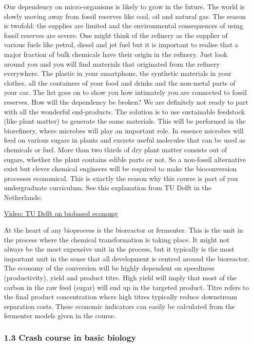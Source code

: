 \documentclass[11pt]{article}
\begin{document}
Our dependency on micro-organisms is likely to grow in the future. The
world is slowly moving away from fossil reserves like coal, oil and
natural gas. The reason is twofold: the supplies are limited and the
environmental consequences of using fossil reserves are severe. One
might think of the refinery as the supplier of various fuels like
petrol, diesel and jet fuel but it is important to realise that a major
fraction of bulk chemicals have their origin in the refinery. Just look
around you and you will find materials that originated from the refinery
everywhere. The plastic in your smartphone, the synthetic materials in
your clothes, all the containers of your food and drinks and the
non-metal parts of your car. The list goes on to show you how intimately
you are connected to fossil reserves. How will the dependency be broken?
We are definitely not ready to part with all the wonderful end-products.
The solution is to use sustainable feedstock (like plant matter) to
generate the same materials. This will be performed in the biorefinery,
where microbes will play an important role. In essence microbes will
feed on various sugars in plants and excrete useful molecules that can
be used as chemicals or fuel. More than two thirds of dry plant matter
consists out of sugars, whether the plant contains edible parts or not.
So a non-fossil alternative exist but clever chemical engineers will be
required to make the bioconversion processes economical. This is exactly
the reason why this course is part of you undergraduate curriculum. See
this explanation from TU Delft in the Netherlands:

\href{https://www.youtube.com/watch?v=1MXHfZqbrCs}{Video: TU Delft on
biobased economy}

At the heart of any bioprocess is the bioreactor or fermenter. This is
the unit in the process where the chemical transformation is taking
place. It might not always be the most expensive unit in the process,
but it typically is the most important unit in the sense that all
development is centred around the bioreactor. The economy of the
conversion will be highly dependent on speediness (productivity), yield
and product titre. High yield will imply that most of the carbon in the
raw feed (sugar) will end up in the targeted product. Titre refers to
the final product concentration where high titres typically reduce
downstream separation costs. These economic indicators can easily be
calculated from the fermenter models given in the course.

    \subsubsection{1.3 Crash course in basic
biology}\label{crash-course-in-basic-biology}
\end{document}

